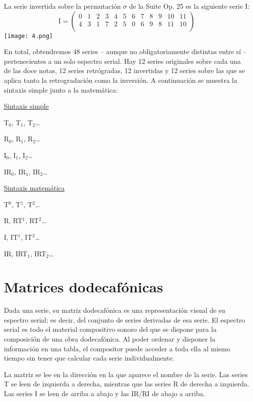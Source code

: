 		La serie invertida sobre la permutación $\sigma$ de la Suite Op. 25 es la siguiente serie I:
		$$
		\text{I}=\left(\begin{matrix}0&1&2&3&4&5&6&7&8&9&10&11\\4&3&1&7&2&5&0&6&9&8&11&10\\\end{matrix}\right)
		$$		
		\texttt{[image: 4.png]}
				
		En total, obtendremos 48 series -- aunque no obligatoriamente distintas entre sí -- pertenecientes a un solo espectro serial. Hay 12 series originales sobre cada una de las doce notas, 12 series retrógradas, 12 invertidas y 12 series sobre las que se aplica tanto la retrogradación como la inversión. A continuación se muestra la sintaxis simple junto a la matemática:
		
		\begin{center}
		\begin{multicols}{2}
			\underline{Sintaxis simple}
			
			T$_0$, T$_1$, T$_2$\ldots
			
			R$_0$, R$_1$, R$_2$\ldots
			
			I$_0$, I$_1$, I$_2$\ldots
			
			IR$_0$, IR$_1$, IR$_2$\ldots
			
			\underline{Sintaxis matemática}
			
			T$^0$, T$^1$, T$^2$\ldots
			
			R, RT$^1$, RT$^2$\ldots
			
			I, IT$^1$, IT$^2$\ldots
			
			IR, IRT$_1$, IRT$_2$\ldots
		\end{multicols}
		\end{center}
	
	\section{Matrices dodecafónicas}
		
		Dada una serie, su matriz dodecafónica es una representación visual de su espectro serial; es decir, del conjunto de series derivadas de esa serie. El espectro serial es todo el material compositivo sonoro del que se dispone para la composición de una obra dodecafónica. Al poder ordenar y disponer la información en una tabla, el compositor puede acceder a toda ella al mismo tiempo sin tener que calcular cada serie individualmente.		
		
		La matriz se lee en la dirección en la que aparece el nombre de la serie. Las series T se leen de izquierda a derecha, mientras que las series R de derecha a izquierda. Las series I se leen de arriba a abajo y las IR/RI de abajo a arriba.
		
